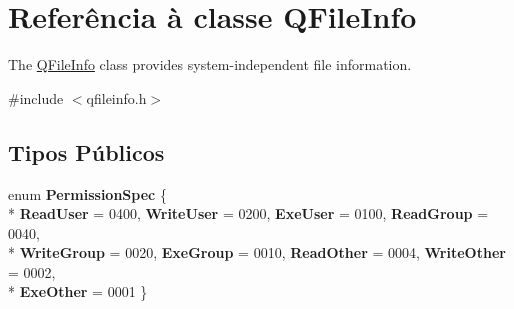 \hypertarget{class_q_file_info}{\section{Referência à classe Q\-File\-Info}
\label{class_q_file_info}
}


The \hyperlink{class_q_file_info}{Q\-File\-Info} class provides system-\/independent file information.  




{\ttfamily \#include $<$qfileinfo.\-h$>$}

\subsection*{Tipos Públicos}
\begin{DoxyCompactItemize}
\item 
enum {\bfseries Permission\-Spec} \{ \\*
{\bfseries Read\-User} = 0400, 
{\bfseries Write\-User} = 0200, 
{\bfseries Exe\-User} = 0100, 
{\bfseries Read\-Group} = 0040, 
\\*
{\bfseries Write\-Group} = 0020, 
{\bfseries Exe\-Group} = 0010, 
{\bfseries Read\-Other} = 0004, 
{\bfseries Write\-Other} = 0002, 
\\*
{\bfseries Exe\-Other} = 0001
 \}
\end{DoxyCompactItemize}
